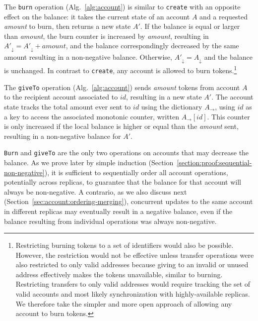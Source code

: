 \documentclass[9pt]{article}   	%
\begin{document}
The \texttt{burn} operation (Alg.~\ref{alg:account}) is similar to \texttt{create} with an opposite effect on the balance: it takes the current state of an account $A$ and a requested \textit{amount} to burn, then returns a new state $A'$. If the balance is equal or larger than \textit{amount}, the burn counter is increased by \textit{amount}, resulting in $A'_\downarrow = A'_\downarrow + \textit{amount}$, and the balance correspondingly decreased by the same amount resulting in a non-negative balance. Otherwise, $A'_\downarrow = A_\downarrow$ and the balance is unchanged. In contrast to \texttt{create}, any account is allowed to burn tokens.\footnote{Restricting burning tokens to a set of identifiers would also be possible. However, the restriction would not be effective unless transfer operations were also restricted to only valid addresses because giving to an invalid or unused address effectively makes the tokens unavailable, similar to burning. Restricting transfers to only valid addresses would require tracking the set of valid accounts and most likely synchronization with highly-available replicas. We therefore take the simpler and more open approach of allowing any account to burn tokens.}

The \texttt{giveTo} operation (Alg.~\ref{alg:account}) sends \textit{amount} tokens from account $A$ to the recipient account associated to $id$, resulting in a new state $A'$. The account state tracks the total amount ever sent to $id$ using the dictionary $A_{\rightarrow}$, using $id$ as a key to access the associated monotonic counter, written $A_{\rightarrow}[id]$. This counter is only increased if the local balance is higher or equal than the \textit{amount} sent, resulting in a non-negative balance for $A'$.

\texttt{Burn} and \texttt{giveTo} are the only two operations on accounts that may decrease the balance. As we prove later by simple induction (Section~\ref{section:proof:sequential-non-negative}), it is sufficient to sequentially order all account operations, potentially across replicas, to guarantee that the balance for that account will always be non-negative. A contrario, as we also discuss next  (Section~\ref{sec:account:ordering-merging}), concurrent updates to the same account in different replicas may eventually result in a negative balance, even if the balance resulting from individual operations was always non-negative.
\end{document}
